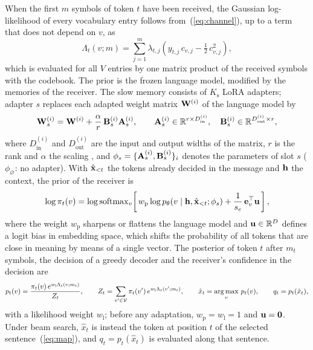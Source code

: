 When the first $m$ symbols of token $t$ have been received, the Gaussian log-likelihood of every vocabulary entry follows from~(\ref{eq:channel}), up to a term that does not depend on $v$, as
\begin{equation}
\Lambda_t(v;m) = \sum_{j=1}^{m}\lambda_{t,j}\left(y_{t,j}\,c_{v,j}-\tfrac{1}{2}\,c_{v,j}^2\right),
\label{eq:likelihood}
\end{equation}
which is evaluated for all $V$ entries by one matrix product of the received symbols with the codebook. The prior is the frozen language model, modified by the memories of the receiver. The slow memory consists of $K_\mathrm{s}$ LoRA adapters; adapter $s$ replaces each adapted weight matrix $\mathbf{W}^{(i)}$ of the language model by
\begin{equation}
\mathbf{W}^{(i)}_s = \mathbf{W}^{(i)} + \frac{\alpha}{r}\,\mathbf{B}^{(i)}_s\mathbf{A}^{(i)}_s,\qquad \mathbf{A}^{(i)}_s\in\mathbb{R}^{r\times D_\mathrm{in}^{(i)}},\quad \mathbf{B}^{(i)}_s\in\mathbb{R}^{D_\mathrm{out}^{(i)}\times r},
\label{eq:lora}
\end{equation}
where $D_\mathrm{in}^{(i)}$ and $D_\mathrm{out}^{(i)}$ are the input and output widths of the matrix, $r$ is the rank and $\alpha$ the scaling \cite{hu2022lora}, and $\phi_s = \{\mathbf{A}^{(i)}_s,\mathbf{B}^{(i)}_s\}_i$ denotes the parameters of slot $s$ ($\phi_\varnothing$: no adapter). With $\hat{\mathbf{x}}_{<t}$ the tokens already decided in the message and $\mathbf{h}$ the context, the prior of the receiver is
\begin{equation}
\log\pi_t(v) = \log\operatorname{softmax}_v\!\left[\,w_\mathrm{p}\log p_{\theta}\!\left(v\mid\mathbf{h},\hat{\mathbf{x}}_{<t};\phi_s\right) + \frac{1}{s_e}\,\mathbf{e}_v^{\top}\mathbf{u}\,\right],
\label{eq:prior}
\end{equation}
where the weight $w_\mathrm{p}$ sharpens or flattens the language model and $\mathbf{u}\in\mathbb{R}^{D}$ defines a logit bias in embedding space, which shifts the probability of all tokens that are close in meaning by means of a single vector. The posterior of token $t$ after $m_t$ symbols, the decision of a greedy decoder and the receiver's confidence in the decision are
\begin{equation}
p_t(v) = \frac{\pi_t(v)\,e^{w_\mathrm{l}\Lambda_t(v;m_t)}}{Z_t},\qquad
Z_t = \sum_{v'\in\mathcal{V}}\pi_t(v')\,e^{w_\mathrm{l}\Lambda_t(v';m_t)},\qquad
\hat{x}_t = \operatorname*{arg\,max}_{v}\,p_t(v),\qquad q_t = p_t(\hat{x}_t),
\label{eq:posterior}
\end{equation}
with a likelihood weight $w_\mathrm{l}$; before any adaptation, $w_\mathrm{p} = w_\mathrm{l} = 1$ and $\mathbf{u} = \mathbf{0}$. Under beam search, $\hat{x}_t$ is instead the token at position $t$ of the selected sentence~(\ref{eq:map}), and $q_t = p_t(\hat{x}_t)$ is evaluated along that sentence.

